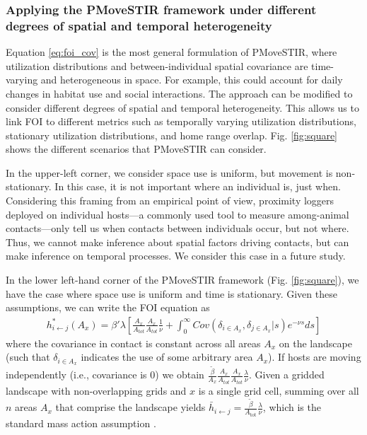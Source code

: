 \documentclass[letterpaper]{article}
\begin{document}

\subsubsection*{Applying the PMoveSTIR framework under different degrees of spatial and temporal heterogeneity}

Equation \ref{eq:foi_cov} is the most general formulation of PMoveSTIR, where utilization distributions and between-individual spatial covariance are time-varying and heterogeneous in space. For example, this could account for daily changes in habitat use and social interactions. The approach can be modified to consider different degrees of spatial and temporal heterogeneity. This allows us to link FOI to different metrics such as temporally varying utilization distributions, stationary utilization distributions, and home range overlap. Fig. \ref{fig:square} shows the different scenarios that PMoveSTIR can consider. 

In the upper-left corner, we consider space use is uniform, but movement is non-stationary. In this case, it is not important where an individual is, just when. Considering this framing from an empirical point of view, proximity loggers deployed on individual hosts---a commonly used tool to measure among-animal contacts---only tell us when contacts between individuals occur, but not where.  Thus, we cannot make inference about spatial factors driving contacts, but can make inference on temporal processes.  We consider this case in a future study.

In the lower left-hand corner of the PMoveSTIR framework (Fig. \ref{fig:square}), we have the case where space use is uniform and time is stationary. 
Given these assumptions, we can write the FOI equation as
\begin{equation}
    \begin{aligned}
        h^*_{i \leftarrow j}(A_x) = \beta' \lambda \left[\frac{A_x}{A_{tot}}\frac{A_x}{A_{tot}} \frac{1}{\nu} +  \int_{0}^{\infty} Cov(\delta_{i \in A_x}, \delta_{j \in A_x} | s) e^{-\nu s} ds\right]
    \end{aligned}
    \label{eq:uniform_stationary1}
\end{equation}
where the covariance in contact is constant across all areas $A_x$ on the landscape (such that $\delta_{i \in A_x}$ indicates the use of some arbitrary area $A_x$).  
If hosts are moving independently (i.e., covariance is 0) we obtain $\frac{\tilde{\beta}}{A_x} \frac{A_x}{A_{tot}} \frac{A_x}{A_{tot}}  \frac{\lambda}{\nu}$. Given a gridded landscape with non-overlapping grids and $x$ is a single grid cell, summing over all $n$ areas $A_x$ that comprise the landscape yields $\bar{h}_{i \leftarrow j} =\frac{\tilde{\beta}}{A_\text{tot}} \frac{\lambda}{\nu}$, which is the standard mass action assumption \citep{McCallum2001}. 
\end{document}
